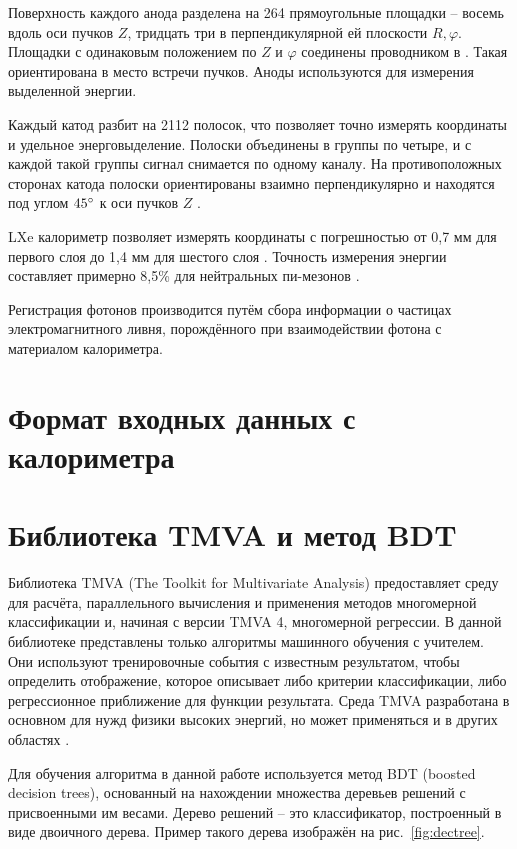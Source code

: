 \documentclass[14pt]{extarticle}
\begin{document}
Поверхность каждого анода разделена на 264 прямоугольные площадки -- восемь вдоль оси пучков $Z$, тридцать три в перпендикулярной ей плоскости $R,\varphi$. Площадки с одинаковым положением по $Z$ и $\varphi$ соединены проводником в . Такая  ориентирована в место встречи пучков. Аноды используются для измерения выделенной энергии.

Каждый катод разбит на 2112 полосок, что позволяет точно измерять координаты и удельное энерговыделение. Полоски объединены в группы по четыре, и с каждой такой группы сигнал снимается по одному каналу. На противоположных сторонах катода полоски ориентированы взаимно перпендикулярно и находятся под углом $45\degree$ к оси пучков $Z$ \cite{shebalin}. 

LXe калориметр позволяет измерять координаты с погрешностью от 0,7 мм для первого слоя до 1,4 мм для шестого слоя \cite{Epifanov_2011,lxe_2009}. Точность измерения энергии составляет примерно 8,5\% для нейтральных пи-мезонов \cite{Anisenkov_2014}.

Регистрация фотонов производится путём сбора информации о частицах электромагнитного ливня, порождённого при взаимодействии фотона с материалом калориметра.
\section{Формат входных данных с калориметра}
\section{Библиотека TMVA и метод BDT}
Библиотека TMVA (The Toolkit for Multivariate Analysis) предоставляет среду для расчёта, параллельного вычисления и применения методов многомерной классификации и, начиная с версии TMVA 4, многомерной регрессии. В данной библиотеке представлены только алгоритмы машинного обучения с учителем. Они используют тренировочные события с известным результатом, чтобы определить отображение, которое описывает либо критерии классификации, либо регрессионное приближение для функции результата. Среда TMVA разработана в основном для нужд физики высоких энергий, но может применяться и в других областях \cite{tmva4}.

Для обучения алгоритма в данной работе используется метод BDT (boosted decision trees), основанный на нахождении множества деревьев решений с присвоенными им весами. Дерево решений -- это классификатор, построенный в виде двоичного дерева. Пример такого дерева изображён на рис.~\ref{fig:dectree}.
\end{document}
